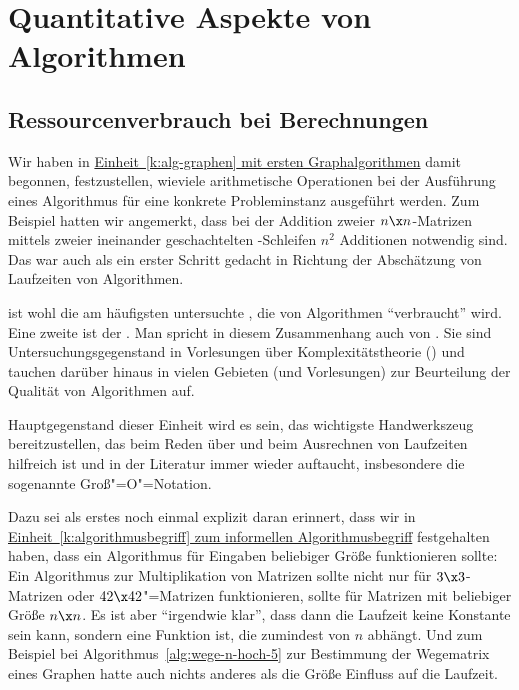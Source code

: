 \Tut\chapter{Quantitative Aspekte von Algorithmen}
\label{k:quantitative-aspekte}

\Tut\section{Ressourcenverbrauch bei Berechnungen}
\label{sec:ressourcen}

Wir haben in \hyperref[k:alg-graphen]{Einheit~\ref{k:alg-graphen} mit
  ersten Graphalgorithmen} damit begonnen, festzustellen, wieviele
arithmetische Operationen bei der Ausführung eines Algorithmus für
eine konkrete Probleminstanz ausgeführt werden. Zum Beispiel hatten
wir angemerkt, dass bei der Addition zweier $n\x n$-Matrizen mittels
zweier ineinander geschachtelten -Schleifen $n^2$ Additionen
notwendig sind. Das war auch als ein erster Schritt gedacht in
Richtung der Abschätzung von Laufzeiten von Algorithmen.

 ist wohl
die am häufigsten untersuchte ,
die von Algorithmen "`verbraucht"' wird. Eine zweite ist der
. Man spricht
in diesem Zusammenhang auch von
. Sie
sind Untersuchungsgegenstand in Vorlesungen über Komplexitätstheorie
() und
tauchen darüber hinaus in vielen Gebieten (und Vorlesungen) zur
Beurteilung der Qualität von Algorithmen auf.

Hauptgegenstand dieser Einheit wird es sein, das wichtigste
Handwerkszeug bereitzustellen, das beim Reden über und beim Ausrechnen
von \zB Laufzeiten hilfreich ist und in der Literatur immer wieder
auftaucht, insbesondere die sogenannte Groß"=O"=Notation.

Dazu sei als erstes noch einmal explizit daran erinnert, dass wir in
\hyperref[k:algorithmusbegriff]{Einheit~\ref{k:algorithmusbegriff} zum
  informellen Algorithmusbegriff} festgehalten haben, dass ein
Algorithmus für Eingaben beliebiger Größe funktionieren sollte: Ein
Algorithmus zur Multiplikation von Matrizen sollte nicht nur für $3\x
3$-Matrizen oder $42\x 42$"=Matrizen funktionieren, sollte für
Matrizen mit beliebiger Größe $n\x n$. Es ist aber "`irgendwie klar"',
dass dann die Laufzeit keine Konstante sein kann, sondern eine
Funktion ist, die zumindest von $n$ abhängt. Und zum Beispiel bei
Algorithmus~\ref{alg:wege-n-hoch-5} zur Bestimmung der Wegematrix
eines Graphen hatte auch nichts anderes als die Größe Einfluss auf die
Laufzeit.

